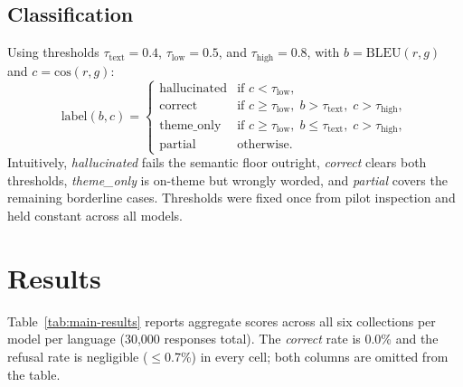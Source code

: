 \documentclass{article}
\begin{document}
\subsection{Classification}
\label{sec:classification}
Using thresholds $\tau_{\text{text}}{=}0.4$, $\tau_{\text{low}}{=}0.5$, and
$\tau_{\text{high}}{=}0.8$, with $b{=}\mathrm{BLEU}(r,g)$ and
$c{=}\mathrm{cos}(r,g)$:
\begin{equation}
  \mathrm{label}(b,c) =
  \begin{cases}
    \mathrm{hallucinated} & \text{if } c < \tau_{\text{low}}, \\
    \mathrm{correct}
      & \text{if } c \ge \tau_{\text{low}},\;
        b > \tau_{\text{text}},\;
        c > \tau_{\text{high}}, \\
    \mathrm{theme\_only}
      & \text{if } c \ge \tau_{\text{low}},\;
        b \le \tau_{\text{text}},\;
        c > \tau_{\text{high}}, \\
    \mathrm{partial} & \text{otherwise.}
  \end{cases}
  \label{eq:classify}
\end{equation}
Intuitively, \emph{hallucinated} fails the semantic floor outright,
\emph{correct} clears both thresholds, \emph{theme\_only} is on-theme but
wrongly worded, and \emph{partial} covers the remaining borderline cases.
Thresholds were fixed once from pilot inspection and held constant across
all models.


\section{Results}
\label{sec:results}

Table~\ref{tab:main-results} reports aggregate scores across all six
collections per model per language (30,000 responses total). The \emph{correct}
rate is 0.0\% and the refusal rate is negligible ($\le$0.7\%) in every cell;
both columns are omitted from the table.
\end{document}
